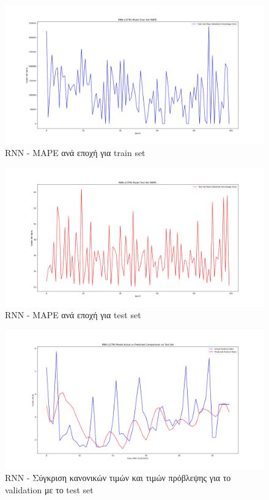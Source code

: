 \documentclass[12pt,a4paper]{article}
\begin{document}
\begin{figure}[H]
	\includegraphics[width=\textwidth]{Figures/Question3/4. RNN Model Train MAPE.png}
	\caption{RNN - MAPE ανά εποχή για train set}
\end{figure}

\begin{figure}[H]
	\includegraphics[width=\textwidth]{Figures/Question3/5. RNN Model Test MAPE.png}
	\caption{RNN - MAPE ανά εποχή για test set}
\end{figure}

\begin{figure}[H]
	\includegraphics[width=\textwidth]{Figures/Question3/6. RNN Actual vs Predicted Test Set.png}
	\caption{RNN - Σύγκριση κανονικών τιμών και τιμών πρόβλεψης για το validation με το test set}
\end{figure}
\end{document}
